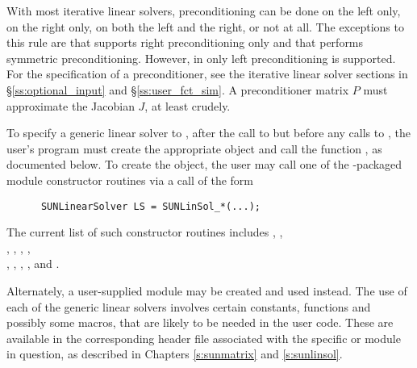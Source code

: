 With most iterative linear solvers, preconditioning can be done on the
left only, on the right only, on both the left and the right, or not
at all.  The exceptions to this rule are {\spfgmr} that supports right
preconditioning only and {\pcg} that performs symmetric
preconditioning.  However, in {\ida} only left preconditioning is
supported.  For the specification of a preconditioner, see the
iterative linear solver sections in \S\ref{ss:optional_input} and
\S\ref{ss:user_fct_sim}. A preconditioner matrix $P$ must approximate
the Jacobian $J$, at least crudely.

To specify a generic linear solver to {\ida}, after the call to
 but before any calls to , the user's
program must create the appropriate {\sunlinsol} object and call
the function , as documented below.
To create the  object, the user may call one of
the {\sundials}-packaged {\sunlinsol} module constructor routines via
a call of the form

\begin{verbatim}
      SUNLinearSolver LS = SUNLinSol_*(...);
\end{verbatim}

The current list of such constructor routines includes
,
,\\ \noindent
{},
,
,
,\\ \noindent
{},
,
,
, and
.

Alternately, a user-supplied
 module may be created and used instead.  The use
of each of the generic linear solvers involves certain constants,
functions and possibly some macros, that are likely to be needed in
the user code.  These are available in the corresponding header file
associated with the specific {\sunmatrix} or {\sunlinsol} module in
question, as described in Chapters \ref{s:sunmatrix} and
\ref{s:sunlinsol}.

